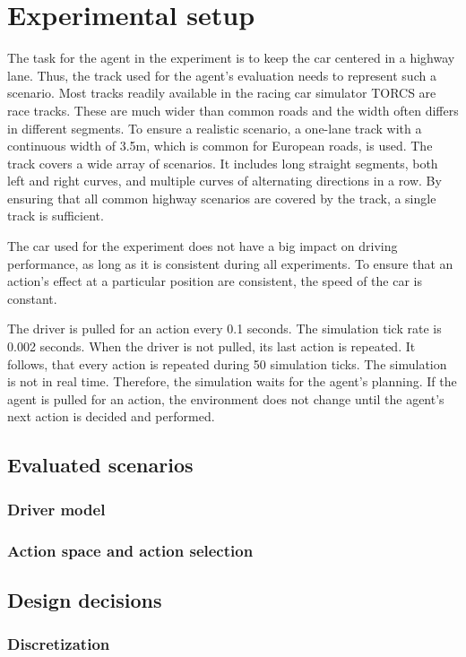 \chapter{Experimental setup}
\label{sec:setup}

The task for the agent in the experiment is to keep the car centered in a highway lane. Thus, the track used for the agent's evaluation needs to represent such a scenario. Most tracks readily available in the racing car simulator TORCS are race tracks. These are much wider than common roads and the width often differs in different segments. To ensure a realistic scenario, a one-lane track with a continuous width of 3.5m, which is common for European roads, is used. The track covers a wide array of scenarios. It includes long straight segments, both left and right curves, and multiple curves of alternating directions in a row. By ensuring that all common highway scenarios are covered by the track, a single track is sufficient.

The car used for the experiment does not have a big impact on driving performance, as long as it is consistent during all experiments. To ensure that an action's effect at a particular position are consistent, the speed of the car is constant.

The driver is pulled for an action every 0.1 seconds. The simulation tick rate is 0.002 seconds. When the driver is not pulled, its last action is repeated. It follows, that every action is repeated during 50 simulation ticks. The simulation is not in real time. Therefore, the simulation waits for the agent's planning. If the agent is pulled for an action, the environment does not change until the agent's next action is decided and performed.

\section{Evaluated scenarios}
\subsection{Driver model}
\subsection{Action space and action selection}
\section{Design decisions}
\subsection{Discretization}
